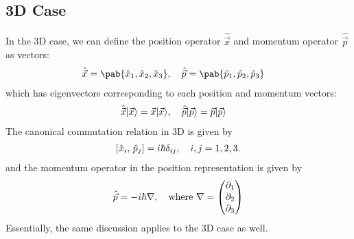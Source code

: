 \subsection{3D Case}
In the 3D case, we can define the position operator $\hat{\vec{x}}$ and momentum operator $\hat{\vec{p}}$ as vectors:
\begin{align}
  \hat{\vec{x}} & = \pab{\hat{x}_1, \hat{x}_2, \hat{x}_3}, \quad \hat{\vec{p}} = \pab{\hat{p}_1, \hat{p}_2, \hat{p}_3}
\end{align}
which has eigenvectors corresponding to each position and momentum vectors:
\begin{align}
  \hat{\vec{x}} \lvert\vec{x}\rangle & = \vec{x} \lvert\vec{x}\rangle, \quad \hat{\vec{p}} \lvert\vec{p}\rangle = \vec{p} \lvert\vec{p}\rangle
\end{align}
The canonical commutation relation in 3D is given by
\begin{align}
  \left\lbrack \hat{x}_i ,\, \hat{p}_j \right\rbrack = i \hbar \delta_{ij}, \quad i, j = 1, 2, 3.
\end{align}
and the momentum operator in the position representation is given by
\begin{align}
  \hat{\vec{p}} = - i \hbar \nabla, \quad \text{where } \nabla = \begin{pmatrix}
                                                                   \pdif{1} \\
                                                                   \pdif{2} \\
                                                                   \pdif{3}
                                                                 \end{pmatrix}
\end{align}
Essentially, the same discussion applies to the 3D case as well.


